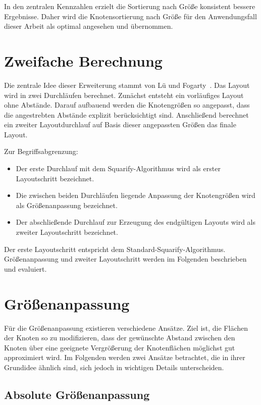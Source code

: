 In den zentralen Kennzahlen erzielt die Sortierung nach Größe konsistent bessere Ergebnisse. Daher wird die Knotensortierung nach Größe für den Anwendungsfall dieser Arbeit als optimal angesehen und übernommen.

\section{Zweifache Berechnung} \label{sec:ZweifachBerechnung}

Die zentrale Idee dieser Erweiterung stammt von Lü und Fogarty~\cite{lu2008cascaded}. Das Layout wird in zwei Durchläufen berechnet. Zunächst entsteht ein vorläufiges Layout ohne Abstände. Darauf aufbauend werden die Knotengrößen so angepasst, dass die angestrebten Abstände explizit berücksichtigt sind. Anschließend berechnet ein zweiter Layoutdurchlauf auf Basis dieser angepassten Größen das finale Layout.

Zur Begriffsabgrenzung:
\begin{itemize}
    \setlength{\itemsep}{0pt}
    \setlength{\parskip}{0pt}
    \setlength{\parsep}{0pt}
    \item Der erste Durchlauf mit dem Squarify-Algorithmus wird als erster Layoutschritt bezeichnet.
    \item Die zwischen beiden Durchläufen liegende Anpassung der Knotengrößen wird als Größenanpassung bezeichnet.
    \item Der abschließende Durchlauf zur Erzeugung des endgültigen Layouts wird als zweiter Layoutschritt bezeichnet.
\end{itemize}

Der erste Layoutschritt entspricht dem Standard-Squarify-Algorithmus. Größenanpassung und zweiter Layoutschritt werden im Folgenden beschrieben und evaluiert.

\section{Größenanpassung} \label{sec:Größenanpassung}

Für die Größenanpassung existieren verschiedene Ansätze. Ziel ist, die Flächen der Knoten so zu modifizieren, dass der gewünschte Abstand zwischen den Knoten über eine geeignete Vergrößerung der Knotenflächen möglichst gut approximiert wird. Im Folgenden werden zwei Ansätze betrachtet, die in ihrer Grundidee ähnlich sind, sich jedoch in wichtigen Details unterscheiden.


\subsection{Absolute Größenanpassung} \label{sec:AbsoluteGrößenanpassung}

